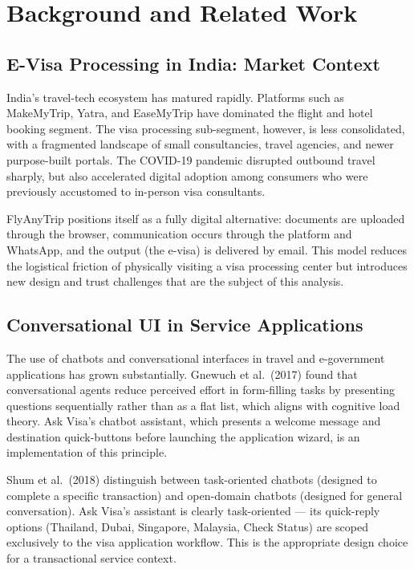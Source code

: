 \documentclass[journal, 10pt, twoside]{IEEEtran}
\begin{document}
\section{Background and Related Work}
\label{sec:background}

\subsection{E-Visa Processing in India: Market Context}
India's travel-tech ecosystem has matured rapidly. Platforms such as
MakeMyTrip, Yatra, and EaseMyTrip have dominated the flight and hotel
booking segment. The visa processing sub-segment, however, is less
consolidated, with a fragmented landscape of small consultancies, travel
agencies, and newer purpose-built portals. The COVID-19 pandemic disrupted
outbound travel sharply, but also accelerated digital adoption among
consumers who were previously accustomed to in-person visa consultants.

FlyAnyTrip positions itself as a fully digital alternative: documents are
uploaded through the browser, communication occurs through the platform
and WhatsApp, and the output (the e-visa) is delivered by email. This
model reduces the logistical friction of physically visiting a visa
processing center but introduces new design and trust challenges that
are the subject of this analysis.

\subsection{Conversational UI in Service Applications}
The use of chatbots and conversational interfaces in travel and e-government
applications has grown substantially. Gnewuch et al.\ (2017) found that
conversational agents reduce perceived effort in form-filling tasks by
presenting questions sequentially rather than as a flat list, which aligns
with cognitive load theory. Ask Visa's chatbot assistant, which presents
a welcome message and destination quick-buttons before launching the
application wizard, is an implementation of this principle.

Shum et al.\ (2018) distinguish between task-oriented chatbots (designed
to complete a specific transaction) and open-domain chatbots (designed for
general conversation). Ask Visa's assistant is clearly task-oriented ---
its quick-reply options (Thailand, Dubai, Singapore, Malaysia, Check Status)
are scoped exclusively to the visa application workflow. This is the
appropriate design choice for a transactional service context.
\end{document}

